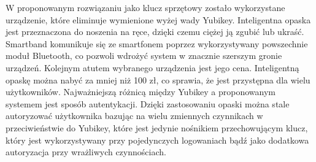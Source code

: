 \indent W proponowanym rozwiązaniu jako klucz sprzętowy zostało wykorzystane urządzenie, które eliminuje wymienione wyżej wady Yubikey. Inteligentna opaska
jest przeznaczona do noszenia na ręce, dzięki czemu ciężej ją zgubić lub ukraść. Smartband komunikuje się ze smartfonem poprzez wykorzystywany
powszechnie moduł Bluetooth, co pozwoli wdrożyć system w znacznie szerszym gronie urządzeń. Kolejnym atutem wybranego urządzenia jest jego cena.
Inteligentną opaskę można nabyć za mniej niż 100 zł, co sprawia, że jest przystępna dla wielu użytkowników. Najważniejszą różnicą między Yubikey a
proponowanym systemem jest sposób autentykacji. Dzięki zastosowaniu opaski można stale autoryzować użytkownika bazując na wielu zmiennych czynnikach w
przeciwieństwie do Yubikey, które jest jedynie nośnikiem przechowującym klucz, który jest wykorzystywany przy pojedynczych logowaniach bądź
jako dodatkowa autoryzacja przy wrażliwych czynnościach.
